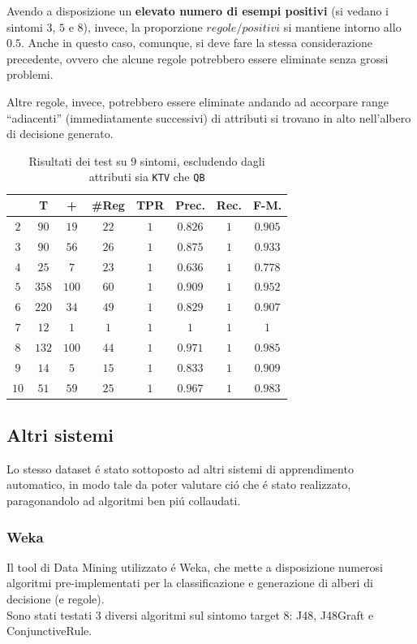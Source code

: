 \documentclass[preprint]{acm_proc_article-sp}
\begin{document}
Avendo a disposizione un \textbf{elevato numero di esempi positivi} (si vedano i sintomi $3$, $5$ e $8$), invece, la proporzione $regole/positivi$ si mantiene intorno allo $0.5$. Anche in questo caso, comunque, si deve fare la stessa considerazione precedente, ovvero che alcune regole potrebbero essere eliminate senza grossi problemi.

Altre regole, invece, potrebbero essere eliminate andando ad accorpare range ``adiacenti'' (immediatamente successivi) di attributi si trovano in alto nell'albero di decisione generato.

\begin{table}[h]
\centering
\begin{tabular}{|c|c|c|c|c|c|c|c|} \hline
& \textbf{T} &\textbf{+} &\textbf{\#Reg} &\textbf{TPR} &\textbf{Prec.} &\textbf{Rec.} &\textbf{F-M.}  \\ \hline \hline
$2$	&$90$	&$19$	&$22$	&$1$	&$0.826$	&$1$	&$0.905$	\\ \hline
$3$ &$90$	&$56$	&$26$	&$1$	&$0.875$	&$1$	&$0.933$	\\ \hline
$4$ &$25$	&$7$	&$23$	&$1$	&$0.636$	&$1$	&$0.778$	\\ \hline
$5$ &$358$	&$100$	&$60$	&$1$	&$0.909$	&$1$	&$0.952$	\\ \hline
$6$ &$220$	&$34$	&$49$	&$1$	&$0.829$	&$1$	&$0.907$	\\ \hline
$7$ &$12$	&$1$	&$1$	&$1$	&$1$		&$1$	&$1$		\\ \hline
$8$ &$132$	&$100$	&$44$	&$1$	&$0.971$	&$1$	&$0.985$	\\ \hline
$9$	&$14$	&$5$	&$15$	&$1$	&$0.833$	&$1$	&$0.909$	\\ \hline
$10$&$51$	&$59$	&$25$	&$1$	&$0.967$	&$1$	&$0.983$	\\
\hline\end{tabular}
\caption{Risultati dei test su $9$ sintomi, escludendo dagli attributi sia \texttt{KTV} che \texttt{QB}}
\label{table:risultati-test}
\end{table}

\subsection{Altri sistemi}
Lo stesso dataset \'e stato sottoposto ad altri sistemi di apprendimento automatico, in modo tale da poter valutare ci\'o che \'e stato realizzato, paragonandolo ad algoritmi ben pi\'u collaudati.

\subsubsection{Weka}
Il tool di Data Mining utilizzato \'e Weka\cite{Weka:2014:Online}, che mette a disposizione numerosi algoritmi pre-implementati per la classificazione e generazione di alberi di decisione (e regole).\\
Sono stati testati $3$ diversi algoritmi sul sintomo target $8$: J48, J48Graft e ConjunctiveRule. 
\end{document}
